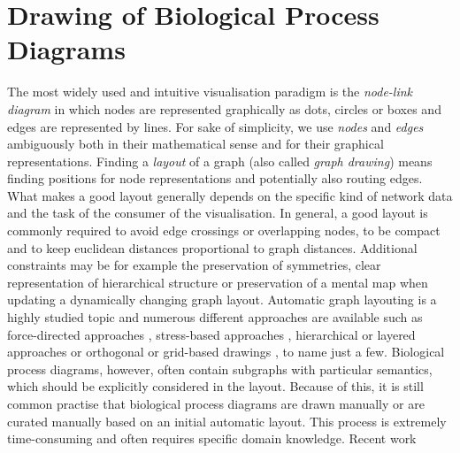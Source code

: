 \documentclass[
	fontsize=10pt, %
	twoside=false, %
	secnumdepth=1, %
]{kaobook}
\begin{document}



\section{Drawing of Biological Process Diagrams}
\label{sec:draw-biol-netw}

The most widely used and intuitive visualisation paradigm is the
\textit{node-link diagram} in which nodes are represented graphically as dots,
circles or boxes and edges are represented by lines. For sake of simplicity, we
use \textit{nodes} and \textit{edges} ambiguously both in their mathematical
sense and for their graphical representations.
%
Finding a \textit{layout} of a graph (also called \textit{graph drawing}) means
finding positions for node representations and potentially also routing edges.
%
What makes a good layout generally depends on the specific kind of network data and the
task of the consumer of the visualisation.
%
In general, a good layout is commonly required to avoid edge crossings or
overlapping nodes, to be compact and to keep euclidean distances proportional to
graph distances.
Additional constraints may be for example the preservation of symmetries, clear
representation of hierarchical structure or preservation of a mental map when
updating a dynamically changing graph layout.
%
Automatic graph layouting is a highly studied topic and numerous different
approaches are available such as force-directed approaches
\cite{kobourov_ForceDirectedDrawingAlgorithms_2013}, stress-based approaches
\cite{gansner_GraphDrawingStress_2005}, hierarchical or layered approaches
\cite{healy_HierarchicalDrawingAlgorithms_2013} or orthogonal or grid-based
drawings \cite{duncan_PlanarOrthogonalPolyline_2013}, to name just a few.
%
Biological process diagrams, however, often contain subgraphs with particular
semantics, which should be explicitly considered in the layout. Because of this,
it is still common practise that biological process diagrams are drawn manually
or are curated manually based on an initial automatic layout. This process is
extremely time-consuming and often requires specific domain knowledge.
Recent work
\cite{siebenhaller_HumanlikeLayoutAlgorithms_2020}\cite{bourqui_MetabolicNetworkVisualization_2007}\cite{kieffer_HOLAHumanlikeOrthogonal_2016}
\end{document}
